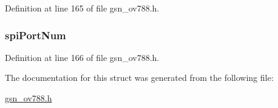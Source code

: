 Definition at line 165 of file gsn\_\-ov788.h.

\hypertarget{a00178_a66613b992321b76dd7fe06a04ba37a58}{
\subsubsection[{spiPortNum}]{ {\bf spiPortNum}}}
\label{a00178_a66613b992321b76dd7fe06a04ba37a58}


Definition at line 166 of file gsn\_\-ov788.h.



The documentation for this struct was generated from the following file:\begin{DoxyCompactItemize}
\item 
\hyperlink{a00537}{gsn\_\-ov788.h}\end{DoxyCompactItemize}
